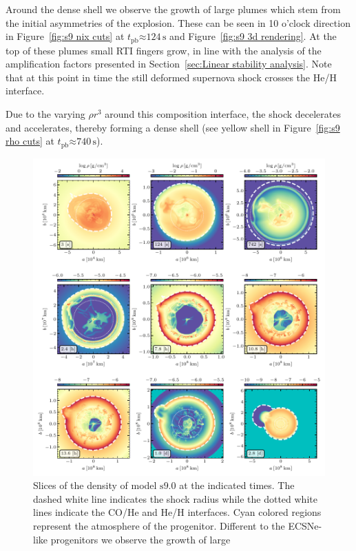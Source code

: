 \documentclass[fleqn,usenatbib]{mnras}
\newcommand{\tpb}{\ensuremath{t_{\text{pb}}}}
\newcommand{\s}{\ensuremath{\text{s}}}
\newcommand{\snine}{\ensuremath{\mathrm{s9.0}}\xspace}
\begin{document}
Around the dense shell we observe the growth of large plumes which stem from the initial 
asymmetries of the explosion. These can be seen in 10 o'clock direction in
Figure~\ref{fig:s9 nix cuts} at $\tpb\mathord{\approx} 124\,\s$ and Figure~\ref{fig:s9 3d rendering}.
At the top of these plumes small RTI fingers grow, in line with the analysis of the amplification factors presented in Section~\ref{sec:Linear stability analysis}. 
Note that at this point in time the still deformed supernova shock crosses the He/H interface.

Due to the varying $\rho r^3$ around this composition interface, the shock decelerates and accelerates, thereby forming a dense shell (see yellow shell in Figure~\ref{fig:s9 rho cuts} at $\tpb\mathord{\approx}740\,\s$). 

\begin{figure}%
\includegraphics[width=\textwidth]{pic/s9_3d_3x3_den.pdf}
    \caption{Slices of the density of model \snine at the indicated times. 
        The dashed white line indicates the shock radius while the 
        dotted white lines indicate the CO/He and He/H interfaces.  Cyan colored regions represent the atmosphere of the progenitor.
        Different to the ECSNe-like progenitors we observe the growth of large 
}
\end{figure}
\end{document}
